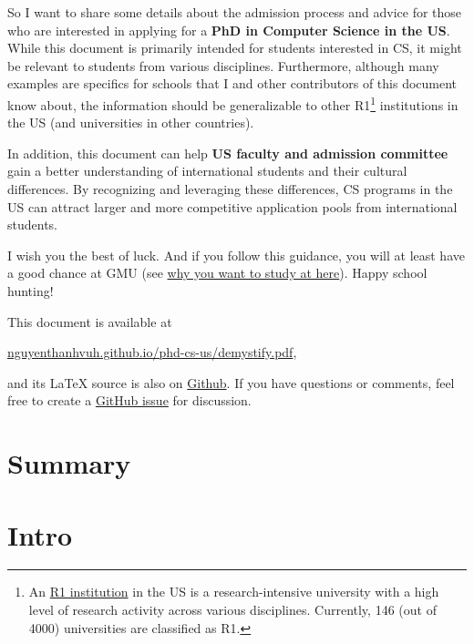 \documentclass[oneside,11pt,dvipsnames]{book}
\begin{document}
So I want to share some details about the admission process and advice for those who are interested in applying for a \textbf{PhD in Computer Science in the US}.
While this document is primarily intended for students interested in CS, it might be relevant to students from various disciplines.
Furthermore, although many examples are specifics for schools that I and other contributors of this document know about, the information should be generalizable to other R1\footnote{An \href{https://en.wikipedia.org/wiki/List_of_research_universities_in_the_United_States}{R1 institution} in the US is a research-intensive university with a high level of research activity across various disciplines. Currently, 146 (out of 4000) universities are classified as R1.} institutions in the US (and universities in other countries).

In addition, this document can help \textbf{US faculty and admission committee} gain a better understanding of international students and their cultural differences.  By recognizing and leveraging these differences, CS programs in the US can attract larger and more competitive application pools from international students.

I wish you the best of luck. And if you follow this guidance, you will at least have a good chance at GMU (see
\href{https://github.com/dynaroars/dynaroars.github.io/wiki/About-GMU}{why
  you want to study at here}). Happy school hunting!

This document is available at 

\begin{center}
  \href{https://nguyenthanhvuh.github.io/phd-cs-us/demystify.pdf}{nguyenthanhvuh.github.io/phd-cs-us/demystify.pdf},
\end{center}

\noindent and its \LaTeX{} source is also on \href{https://github.com/nguyenthanhvuh/phd-cs-us}{Github}. If you have questions or comments, feel free to create a \href{https://github.com/nguyenthanhvuh/phd-cs-us/issues}{GitHub issue} for discussion.

\newpage
\tableofcontents*

\chapter{Summary}\label{sec:summary}
\mainmatter
\chapter{Intro}
\end{document}
